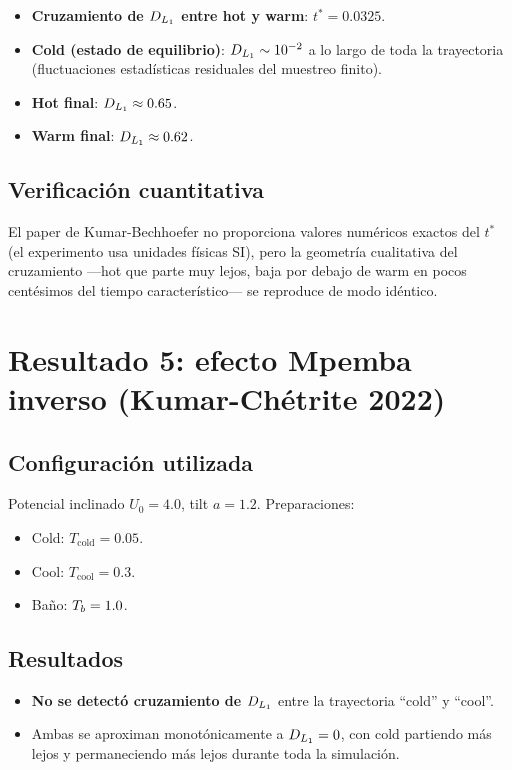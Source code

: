 \begin{itemize}
\item \textbf{Cruzamiento de $D_{L_{1}}$ entre hot y warm}: $t^{\ast} = 0.0325$.
\item \textbf{Cold (estado de equilibrio)}: $D_{L_{1}} \sim 10^{-2}$ a lo largo de 
toda la trayectoria (fluctuaciones estadísticas residuales del muestreo finito).
\item \textbf{Hot final}: $D_{L_{1}} \approx 0.65$.
\item \textbf{Warm final}: $D_{L_{1}} \approx 0.62$.
\end{itemize}

\subsection{Verificación cuantitativa}

El paper de Kumar-Bechhoefer no proporciona valores numéricos exactos del 
$t^{\ast}$ (el experimento usa unidades físicas SI), pero la geometría 
cualitativa del cruzamiento ---hot que parte muy lejos, baja por debajo de warm 
en pocos centésimos del tiempo característico--- se reproduce de modo idéntico.

\section{Resultado 5: efecto Mpemba inverso (Kumar-Chétrite 2022)}

\subsection{Configuración utilizada}

Potencial inclinado $U_0 = 4.0$, tilt $a = 1.2$. Preparaciones:
\begin{itemize}
\item Cold: $T_{\mathrm{cold}} = 0.05$.
\item Cool: $T_{\mathrm{cool}} = 0.3$.
\item Baño: $T_{b} = 1.0$.
\end{itemize}

\subsection{Resultados}

\begin{itemize}
\item \textbf{No se detectó cruzamiento de $D_{L_{1}}$} entre la trayectoria 
``cold'' y ``cool''.
\item Ambas se aproximan monotónicamente a $D_{L_{1}} = 0$, con cold partiendo 
más lejos y permaneciendo más lejos durante toda la simulación.
\end{itemize}

